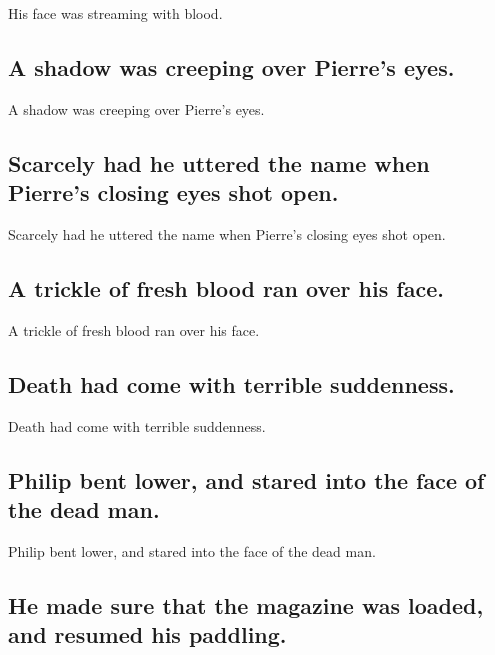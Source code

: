 \documentclass[]{article}
\begin{document}
His face was streaming with blood.

\hypertarget{a-shadow-was-creeping-over-pierres-eyes.}{%
\subsection{A shadow was creeping over Pierre's
eyes.}\label{a-shadow-was-creeping-over-pierres-eyes.}}

A shadow was creeping over Pierre's eyes.

\hypertarget{scarcely-had-he-uttered-the-name-when-pierres-closing-eyes-shot-open.}{%
\subsection{Scarcely had he uttered the name when Pierre's closing eyes
shot
open.}\label{scarcely-had-he-uttered-the-name-when-pierres-closing-eyes-shot-open.}}

Scarcely had he uttered the name when Pierre's closing eyes shot open.

\hypertarget{a-trickle-of-fresh-blood-ran-over-his-face.}{%
\subsection{A trickle of fresh blood ran over his
face.}\label{a-trickle-of-fresh-blood-ran-over-his-face.}}

A trickle of fresh blood ran over his face.

\hypertarget{death-had-come-with-terrible-suddenness.}{%
\subsection{Death had come with terrible
suddenness.}\label{death-had-come-with-terrible-suddenness.}}

Death had come with terrible suddenness.

\hypertarget{philip-bent-lower-and-stared-into-the-face-of-the-dead-man.}{%
\subsection{Philip bent lower, and stared into the face of the dead
man.}\label{philip-bent-lower-and-stared-into-the-face-of-the-dead-man.}}

Philip bent lower, and stared into the face of the dead man.

\hypertarget{he-made-sure-that-the-magazine-was-loaded-and-resumed-his-paddling.}{%
\subsection{He made sure that the magazine was loaded, and resumed his
paddling.}\label{he-made-sure-that-the-magazine-was-loaded-and-resumed-his-paddling.}}
\end{document}
